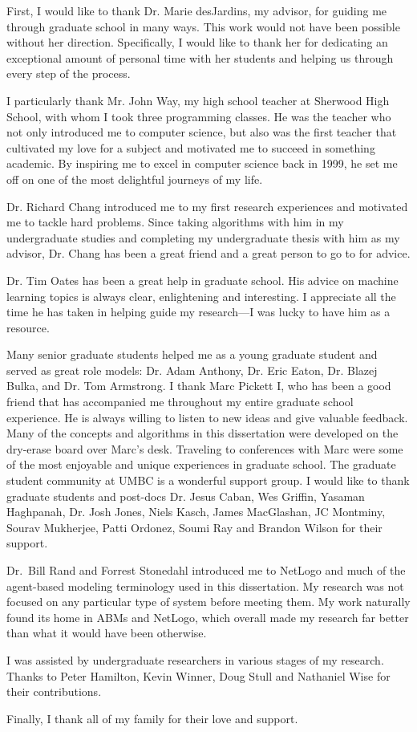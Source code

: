 \pagestyle{plain}

First, I would like to thank Dr. Marie desJardins, my advisor, for guiding me through graduate school in many ways.
This work would not have been possible without her direction.
Specifically, I would like to thank her for dedicating an exceptional amount of personal time with her students and helping us through every step of the process.

I particularly thank Mr. John Way, my high school teacher at Sherwood High School, with whom I took three programming classes.
He was the teacher who not only introduced me to computer science, but also was the first teacher that cultivated my love for a subject and motivated me to succeed in something academic.
By inspiring me to excel in computer science back in 1999, he set me off on one of the most delightful journeys of my life.

Dr. Richard Chang introduced me to my first research experiences and motivated me to tackle hard problems.
Since taking algorithms with him in my undergraduate studies and completing my undergraduate thesis with him as my advisor, Dr. Chang has been a great friend and a great person to go to for advice.

Dr. Tim Oates has been a great help in graduate school.
His advice on machine learning topics is always clear, enlightening and interesting.
I appreciate all the time he has taken in helping guide my research---I was lucky to have him as a resource.

Many senior graduate students helped me as a young graduate student and served as great role models: Dr. Adam Anthony, Dr. Eric Eaton,  Dr. Blazej Bulka, and Dr. Tom Armstrong.
I thank Marc Pickett I, who has been a good friend that has accompanied me throughout my entire graduate school experience.
He is always willing to listen to new ideas and give valuable feedback.
Many of the concepts and algorithms in this dissertation were developed on the dry-erase board over Marc's desk.
Traveling to conferences with Marc were some of the most enjoyable and unique experiences in graduate school.
The graduate student community at UMBC is a wonderful support group.
I would like to thank graduate students and post-docs Dr. Jesus Caban, Wes Griffin, Yasaman Haghpanah, Dr. Josh Jones, Niels Kasch, James MacGlashan, JC Montminy, Sourav Mukherjee, Patti Ordonez, Soumi Ray and Brandon Wilson for their support.

Dr.~{}Bill Rand and Forrest Stonedahl introduced me to NetLogo and much of the agent-based modeling terminology used in this dissertation.
My research was not focused on any particular type of system before meeting them.
My work naturally found its home in ABMs and NetLogo, which overall made my research far better than what it would have been otherwise.

I was assisted by undergraduate researchers in various stages of my research.
Thanks to Peter Hamilton, Kevin Winner, Doug Stull and Nathaniel Wise for their contributions.

Finally, I thank all of my family for their love and support.


